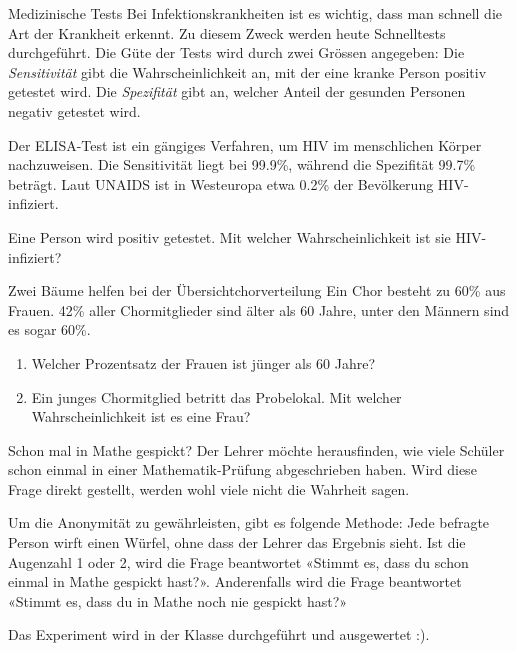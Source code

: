 \clearpage
\begin{bsp}
  {Medizinische Tests}{}
  Bei Infektionskrankheiten ist es wichtig, dass man schnell die Art der Krankheit erkennt. Zu diesem Zweck werden heute Schnelltests durchgeführt. Die Güte der Tests wird durch zwei Grössen angegeben: Die \emph{Sensitivität} gibt die Wahrscheinlichkeit an, mit der eine kranke Person positiv getestet wird. Die \emph{Spezifität} gibt an, welcher Anteil der gesunden Personen negativ getestet wird.

  Der ELISA-Test ist ein gängiges Verfahren, um HIV im menschlichen Körper nachzuweisen. Die Sensitivität liegt bei 99.9\%, während die Spezifität 99.7\% beträgt. Laut UNAIDS ist in Westeuropa etwa 0.2\% der Bevölkerung HIV-infiziert.

  Eine Person wird positiv getestet. Mit welcher Wahrscheinlichkeit ist sie HIV-infiziert?

  \vspace*{17cm}

\end{bsp}




\begin{bsp}
  {Zwei Bäume helfen bei der Übersicht}{chorverteilung}
  Ein Chor besteht zu 60\% aus Frauen. 42\% aller Chormitglieder sind älter als 60 Jahre, unter den Männern sind es sogar 60\%.
  \begin{enumerate}
    \item Welcher Prozentsatz der Frauen ist jünger als 60 Jahre?
    \item Ein junges Chormitglied betritt das Probelokal. Mit welcher Wahrscheinlichkeit ist es eine Frau?
  \end{enumerate}
  \vspace*{15 cm}
\end{bsp}
\clearpage
\begin{bsp}
  {Schon mal in Mathe gespickt?}{}
  Der Lehrer möchte herausfinden, wie viele Schüler schon einmal in einer Mathematik-Prüfung abgeschrieben haben. Wird diese Frage direkt gestellt, werden wohl viele nicht die Wahrheit sagen.

  Um die Anonymität zu gewährleisten, gibt es folgende Methode: Jede befragte Person wirft einen Würfel, ohne dass der Lehrer das Ergebnis sieht. Ist die Augenzahl 1 oder 2, wird die Frage beantwortet «Stimmt es, dass du schon einmal in Mathe gespickt hast?». Anderenfalls wird die Frage beantwortet «Stimmt es, dass du in Mathe noch nie gespickt hast?»

  Das Experiment wird in der Klasse durchgeführt und ausgewertet :).

  \vspace*{17cm}

\end{bsp}

